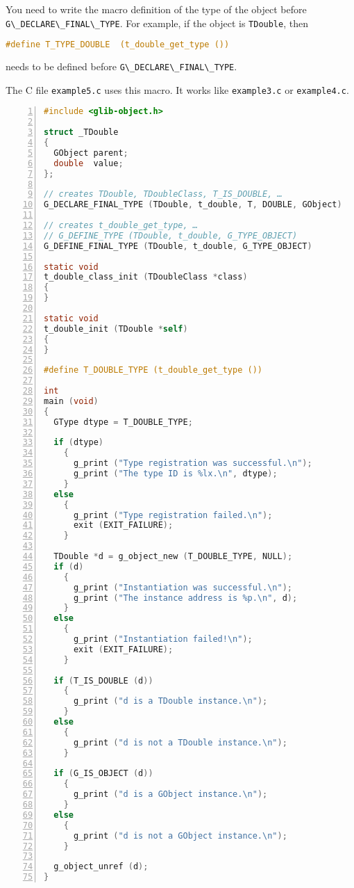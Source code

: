 You need to write the macro definition of the type of the object before
\passthrough{\lstinline!G\_DECLARE\_FINAL\_TYPE!}. For example, if the
object is \passthrough{\lstinline!TDouble!}, then

\begin{lstlisting}[language=C]
#define T_TYPE_DOUBLE  (t_double_get_type ())
\end{lstlisting}

needs to be defined before
\passthrough{\lstinline!G\_DECLARE\_FINAL\_TYPE!}.

The C file \passthrough{\lstinline!example5.c!} uses this macro. It
works like \passthrough{\lstinline!example3.c!} or
\passthrough{\lstinline!example4.c!}.

\begin{lstlisting}[language=C, numbers=left]
#include <glib-object.h>

struct _TDouble
{
  GObject parent;
  double  value;
};

// creates TDouble, TDoubleClass, T_IS_DOUBLE, …
G_DECLARE_FINAL_TYPE (TDouble, t_double, T, DOUBLE, GObject)

// creates t_double_get_type, …
// G_DEFINE_TYPE (TDouble, t_double, G_TYPE_OBJECT)
G_DEFINE_FINAL_TYPE (TDouble, t_double, G_TYPE_OBJECT)

static void
t_double_class_init (TDoubleClass *class)
{
}

static void
t_double_init (TDouble *self)
{
}

#define T_DOUBLE_TYPE (t_double_get_type ())

int
main (void)
{
  GType dtype = T_DOUBLE_TYPE;

  if (dtype)
    {
      g_print ("Type registration was successful.\n");
      g_print ("The type ID is %lx.\n", dtype);
    }
  else
    {
      g_print ("Type registration failed.\n");
      exit (EXIT_FAILURE);
    }

  TDouble *d = g_object_new (T_DOUBLE_TYPE, NULL);
  if (d)
    {
      g_print ("Instantiation was successful.\n");
      g_print ("The instance address is %p.\n", d);
    }
  else
    {
      g_print ("Instantiation failed!\n");
      exit (EXIT_FAILURE);
    }

  if (T_IS_DOUBLE (d))
    {
      g_print ("d is a TDouble instance.\n");
    }
  else
    {
      g_print ("d is not a TDouble instance.\n");
    }

  if (G_IS_OBJECT (d))
    {
      g_print ("d is a GObject instance.\n");
    }
  else
    {
      g_print ("d is not a GObject instance.\n");
    }

  g_object_unref (d);
}
\end{lstlisting}

